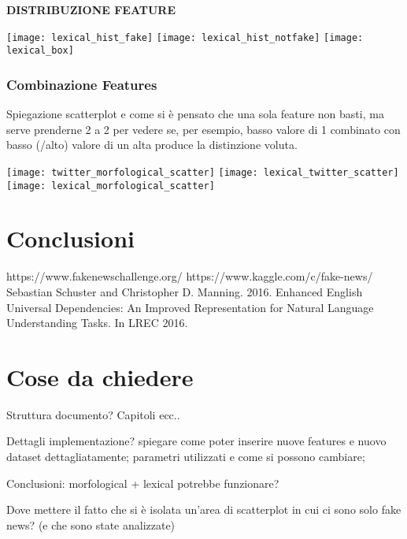 \documentclass{article}
\begin{document}
\begin{multicols}{2}
				\textbf{DISTRIBUZIONE FEATURE}	
					
				\texttt{[image: lexical\_hist\_fake]}
				\texttt{[image: lexical\_hist\_notfake]}
				\texttt{[image: lexical\_box]}
				
				\subsubsection{Combinazione Features}
				Spiegazione scatterplot e come si è pensato che una sola feature non basti, ma serve prenderne 2 a 2 per vedere se, per esempio, basso valore di 1 combinato con basso (/alto) valore di un alta produce la distinzione voluta.
				
				\texttt{[image: twitter\_morfological\_scatter]}
				\texttt{[image: lexical\_twitter\_scatter]}
				\texttt{[image: lexical\_morfological\_scatter]}
				

		\section{Conclusioni}	
	
	   	\end{multicols}		    
		\begin{thebibliography}{9}
				https://www.fakenewschallenge.org/
				https://www.kaggle.com/c/fake-news/
				 Sebastian Schuster and Christopher D. Manning. 2016. Enhanced English Universal Dependencies: An Improved Representation for Natural Language Understanding Tasks. In LREC 2016. 
		\end{thebibliography}
	
		\newpage
		
			\section{Cose da chiedere}
		Struttura documento? Capitoli ecc..
		
		Dettagli implementazione? spiegare come poter inserire nuove features e nuovo dataset dettagliatamente; parametri utilizzati e come si possono cambiare; 
		
		Conclusioni: morfological + lexical potrebbe funzionare? 
		
		Dove mettere il fatto che si è isolata un'area di scatterplot in cui ci sono solo fake news? (e che sono state analizzate)
		
\end{document}
